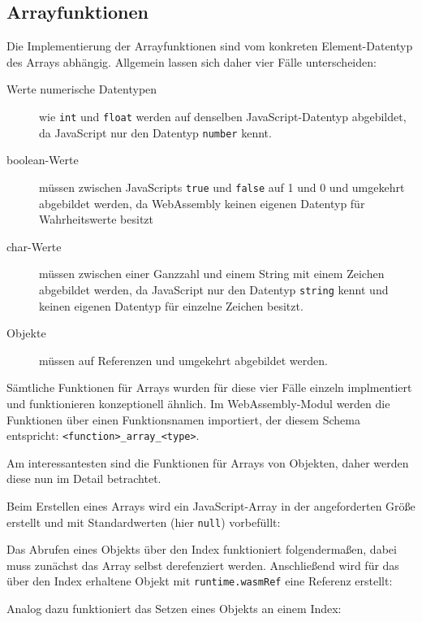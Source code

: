 \subsection{Arrayfunktionen}

Die Implementierung der Arrayfunktionen sind vom konkreten Element-Datentyp des Arrays abhängig. Allgemein lassen sich daher vier Fälle unterscheiden:

\begin{description}
    \item[Werte numerische Datentypen] wie \lstinline{int} und \lstinline{float} werden auf denselben JavaScript-Daten\-typ abgebildet, da JavaScript nur den Datentyp \lstinline{number} kennt.
    \item[boolean-Werte] müssen zwischen JavaScripts \lstinline{true} und \lstinline{false} auf 1 und 0 und umgekehrt abgebildet werden, da WebAssembly keinen eigenen Datentyp für Wahrheitswerte besitzt
    \item[char-Werte] müssen zwischen einer Ganzzahl und einem String mit einem Zeichen abgebildet werden, da JavaScript nur den Datentyp \lstinline{string} kennt und keinen eigenen Datentyp für einzelne Zeichen besitzt.
    \item[Objekte] müssen auf Referenzen und umgekehrt abgebildet werden. 
\end{description}

Sämtliche Funktionen für Arrays wurden für diese vier Fälle einzeln implmentiert und funktionieren konzeptionell ähnlich. Im WebAssembly-Modul werden die Funktionen über einen Funktionsnamen importiert, der diesem Schema entspricht: \lstinline{<function>_array_<type>}.

Am interessantesten sind die Funktionen für Arrays von Objekten, daher werden diese nun im Detail betrachtet.

Beim Erstellen eines Arrays wird ein JavaScript-Array in der angeforderten Größe erstellt und mit Standardwerten (hier \lstinline{null}) vorbefüllt:


Das Abrufen eines Objekts über den Index funktioniert folgendermaßen, dabei muss zunächst das Array selbst derefenziert werden. Anschließend wird für das über den Index erhaltene Objekt mit \lstinline{runtime.wasmRef} eine Referenz erstellt:


Analog dazu funktioniert das Setzen eines Objekts an einem Index:


